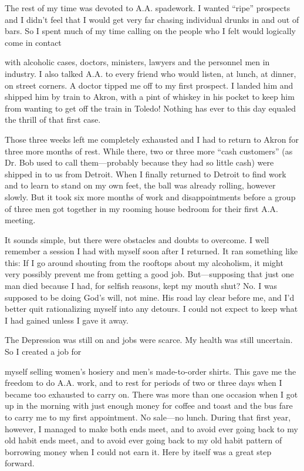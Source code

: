 The rest of my time was devoted to A.A. spadework. I wanted “ripe” prospects and I didn’t feel that I would get very far chasing individual drunks in and out of bars. So I spent much of my time calling on the people who I felt would logically come in contact

with alcoholic cases, doctors, ministers, lawyers and the personnel men in industry. I also talked A.A. to every friend who would listen, at lunch, at dinner, on street corners. A doctor tipped me off to my first prospect. I landed him and shipped him by train to Akron, with a pint of whiskey in his pocket to keep him from wanting to get off the train in Toledo! Nothing has ever to this day equaled the thrill of that first case.

Those three weeks left me completely exhausted and I had to return to Akron for three more months of rest. While there, two or three more “cash customers” (as Dr. Bob used to call them—probably because they had so little cash) were shipped in to us from Detroit. When I finally returned to Detroit to find work and to learn to stand on my own feet, the ball was already rolling, however slowly. But it took six more months of work and disappointments before a group of three men got together in my rooming house bedroom for their first A.A. meeting.

It sounds simple, but there were obstacles and doubts to overcome. I well remember a session I had with myself soon after I returned. It ran something like this: If I go around shouting from the rooftops about my alcoholism, it might very possibly prevent me from getting a good job. But—supposing that just one man died because I had, for selfish reasons, kept my mouth shut? No. I was supposed to be doing God’s will, not mine. His road lay clear before me, and I’d better quit rationalizing myself into any detours. I could not expect to keep what I had gained unless I gave it away.

The Depression was still on and jobs were scarce. My health was still uncertain. So I created a job for

myself selling women’s hosiery and men’s made-to-order shirts. This gave me the freedom to do A.A. work, and to rest for periods of two or three days when I became too exhausted to carry on. There was more than one occasion when I got up in the morning with just enough money for coffee and toast and the bus fare to carry me to my first appointment. No sale—no lunch. During that first year, however, I managed to make both ends meet, and to avoid ever going back to my old habit ends meet, and to avoid ever going back to my old habit pattern of borrowing money when I could not earn it. Here by itself was a great step forward.

